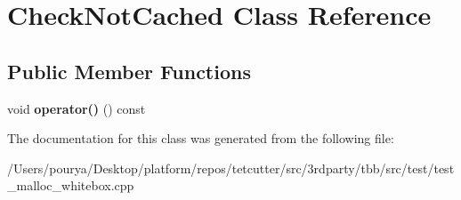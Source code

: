 \hypertarget{classCheckNotCached}{}\section{Check\+Not\+Cached Class Reference}
\label{classCheckNotCached}
\subsection*{Public Member Functions}
\begin{DoxyCompactItemize}
\item 
\hypertarget{classCheckNotCached_a45f67f176451ee392c5abdcd3e5b1f7a}{}void {\bfseries operator()} () const \label{classCheckNotCached_a45f67f176451ee392c5abdcd3e5b1f7a}

\end{DoxyCompactItemize}


The documentation for this class was generated from the following file\+:\begin{DoxyCompactItemize}
\item 
/\+Users/pourya/\+Desktop/platform/repos/tetcutter/src/3rdparty/tbb/src/test/test\+\_\+malloc\+\_\+whitebox.\+cpp\end{DoxyCompactItemize}
